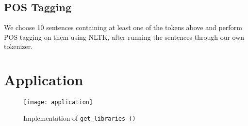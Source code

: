 \subsection{POS Tagging}

We choose 10 sentences containing at least one of the tokens above and
perform POS tagging on them using NLTK, after running the sentences
through our own tokenizer.

\section{Application}

\begin{figure}[ht]
\texttt{[image: application]}
\caption{Implementation of \texttt{get\_libraries\,()}}\label{img:app}
\end{figure}